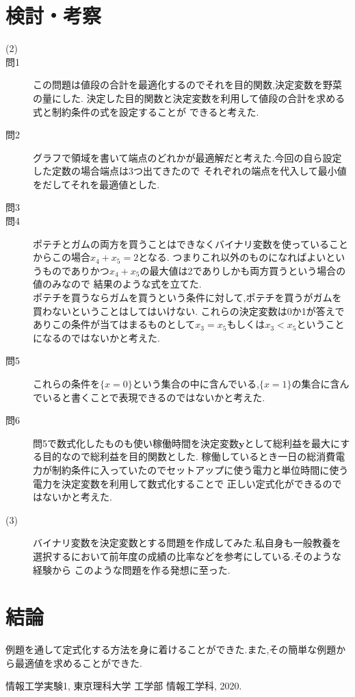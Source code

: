 \documentclass[12pt]{jarticle}
\begin{document}
\section{検討・考察}
\begin{description}
    \item[(2)]
    \item[問1] この問題は値段の合計を最適化するのでそれを目的関数,決定変数を野菜の量にした.
          決定した目的関数と決定変数を利用して値段の合計を求める式と制約条件の式を設定することが
          できると考えた.
    \item[問2]
          グラフで領域を書いて端点のどれかが最適解だと考えた.今回の自ら設定した定数の場合端点は3つ出てきたので
          それぞれの端点を代入して最小値をだしてそれを最適値とした. 
    \item[問3]
          
    \item[問4]
          ポテチとガムの両方を買うことはできなくバイナリ変数を使っていることからこの場合$x_4+x_5=2$となる.
          つまりこれ以外のものになればよいというものでありかつ$x_4+x_5$の最大値は2でありしかも両方買うという場合の値のみなので
          結果のような式を立てた.\\
          ポテチを買うならガムを買うという条件に対して,ポテチを買うがガムを買わないということはしてはいけない.
          これらの決定変数は0か1が答えでありこの条件が当てはまるものとして$x_3=x_5$もしくは$x_3<x_5$ということになるのではないかと考えた.   
    \item[問5]
          これらの条件を$\{x=0\}$という集合の中に含んでいる,$\{x=1\}$の集合に含んでいると書くことで表現できるのではないかと考えた.   
    \item[問6]
          問5で数式化したものも使い稼働時間を決定変数$\boldsymbol{y}$として総利益を最大にする目的なので総利益を目的関数とした.
          稼働しているとき一日の総消費電力が制約条件に入っていたのでセットアップに使う電力と単位時間に使う電力を決定変数を利用して数式化することで
          正しい定式化ができるのではないかと考えた. 
    \item[(3)]
          バイナリ変数を決定変数とする問題を作成してみた.私自身も一般教養を選択するにおいて前年度の成績の比率などを参考にしている.そのような経験から
          このような問題を作る発想に至った.  
\end{description}
\section{結論}
例題を通して定式化する方法を身に着けることができた.また,その簡単な例題から最適値を求めることができた.
\begin{thebibliography}{99}
    \label{sannkoubunnkenn_chapter}
    情報工学実験1,
    東京理科大学 工学部 情報工学科, 2020. 
\end{thebibliography}
\clearpage
\appendix
\end{document}
